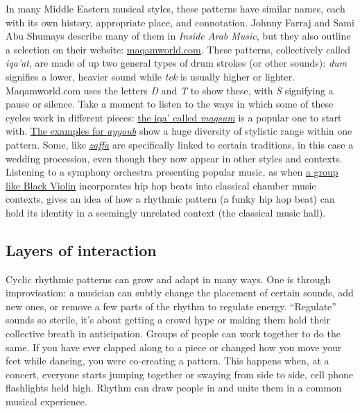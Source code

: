 \documentclass[twoside]{article}
\begin{document}
In many Middle Eastern musical styles, these patterns have similar
names, each with its own history, appropriate place, and connotation.
Johnny Farraj and Sami Abu Shumays describe many of them in \emph{Inside
Arab Music}, but they also outline a selection on their website:
\href{http://www.maqamworld.com/en/iqaa.php}{maqamworld.com}. These
patterns, collectively called \emph{iqa'at}, are made of up two general
types of drum strokes (or other sounds): \emph{dum} signifies a lower,
heavier sound while \emph{tek} is usually higher or lighter.
Maqamworld.com uses the letters \emph{D} and \emph{T} to show these,
with \emph{S} signifying a pause or silence. Take a moment to listen to
the ways in which some of these cycles work in different pieces:
\href{http://www.maqamworld.com/en/iqaa/maqsum.php}{the iqa' called
\emph{maqsum}} is a popular one to start with.
\href{http://www.maqamworld.com/en/iqaa/ayyub.php}{The examples for
\emph{ayyoub}} show a huge diversity of stylistic range within one
pattern. Some, like
\href{http://www.maqamworld.com/en/iqaa/zaffa.php}{\emph{zaffa}} are
specifically linked to certain traditions, in this case a wedding
procession, even though they now appear in other styles and contexts.
Listening to a symphony orchestra presenting popular music, as when
\href{https://www.youtube.com/watch?v=Tb5zO7OybPg}{a group like Black
Violin} incorporates hip hop beats into classical chamber music
contexts, gives an idea of how a rhythmic pattern (a funky hip hop beat)
can hold its identity in a seemingly unrelated context (the classical
music hall).

\hypertarget{layers-of-interaction}{%
\subsection*{Layers of interaction}\label{layers-of-interaction}}

Cyclic rhythmic patterns can grow and adapt in many ways. One is through
improvisation: a musician can subtly change the placement of certain
sounds, add new ones, or remove a few parts of the rhythm to regulate
energy. ``Regulate'' sounds so sterile, it's about getting a crowd hype
or making them hold their collective breath in anticipation. Groups of
people can work together to do the same. If you have ever clapped along
to a piece or changed how you move your feet while dancing, you were
co-creating a pattern. This happens when, at a concert, everyone starts
jumping together or swaying from side to side, cell phone flashlights
held high. Rhythm can draw people in and unite them in a common musical
experience.
\end{document}
